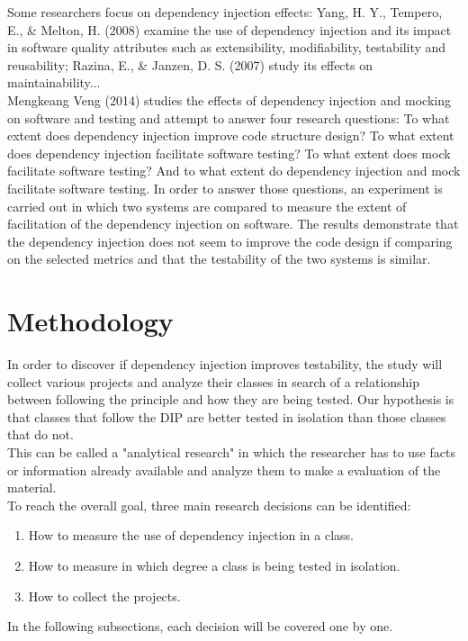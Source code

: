 \documentclass[11pt, a4paper, twocolumn]{article}
\begin{document}
Some researchers focus on dependency injection effects: 
{\color{myblue} Yang, H. Y., Tempero, E., \& Melton, H. (2008)} \cite{dependencyjava} examine the use of dependency injection and its impact in software quality attributes such as extensibility, modifiability, testability and reusability; 
{\color{myblue} Razina, E., \& Janzen, D. S. (2007)} \cite{maintainability} study its effects on maintainability...\\
{\color{myblue} Mengkeang Veng (2014)} \cite{dependency} studies the effects of dependency injection and mocking on software and testing and attempt to answer four research questions: To what extent does dependency injection improve code structure design? To what extent does dependency injection facilitate software testing? To what extent does mock facilitate software testing? And to what extent do dependency injection and mock facilitate software testing. In order to answer those questions, an experiment is carried out in which two systems are compared to measure the extent of facilitation of the dependency injection on software. The results demonstrate that the dependency injection does not seem to improve the code design if comparing on the selected metrics and that the testability of the two systems is similar.



\section{Methodology}
In order to discover if dependency injection improves testability, the study will collect various projects and analyze their classes in search of a relationship between following the principle and how they are being tested. Our hypothesis is that classes that follow the DIP are better tested in isolation than those classes that do not.\\ 
This can be called a "analytical research" in which the researcher has to use facts or information already available and analyze them to make a evaluation of the material.\\
To reach the overall goal, three main research decisions can be identified: 
\begin{enumerate}
\item How to measure the use of dependency injection in a class.
\item How to measure in which degree a class is being tested in isolation.
\item How to collect the projects.
\end{enumerate}
In the following subsections, each decision will be covered one by one.
\end{document}
